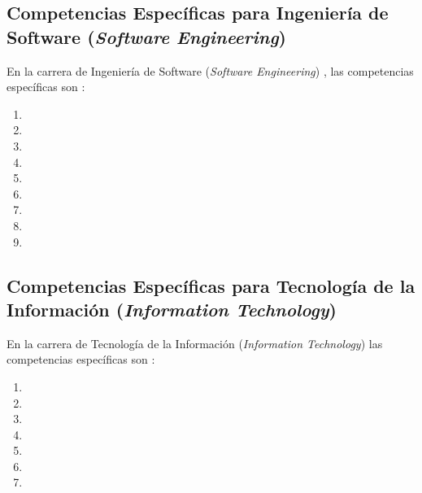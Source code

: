 \subsection{Competencias Específicas para Ingeniería de Software (\textit{Software Engineering})}
En la carrera de Ingeniería de Software (\textit{Software Engineering}) \cite{SoftwareEngineering2004}, las competencias específicas son \cite{IEEECompetences}:
\begin{enumerate}
\renewcommand{\theenumi}{SE\arabic{enumi}}
\item {}
\item {}
\item {}
\item {}
\item {}
\item {}
\item {}
\item {}
\item {}
\end{enumerate}

\subsection{Competencias Específicas para Tecnología de la Información (\textit{Information Technology})}
En la carrera de Tecnología de la Información (\textit{Information Technology}) \cite{InformationTechnology2005} las competencias específicas son \cite{IEEECompetences}:
\begin{enumerate}
\renewcommand{\theenumi}{IT\arabic{enumi}}
\item {}
\item {}
\item {}
\item {}
\item {}
\item {}
\item {}
\end{enumerate}

